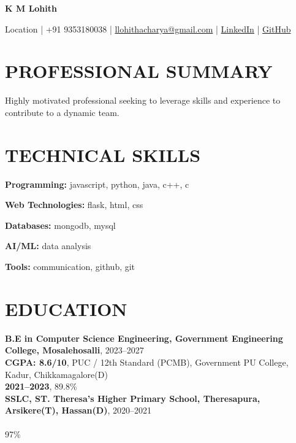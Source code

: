 \documentclass[10pt,a4paper]{article}
\begin{document}

\begin{center}

{\LARGE \textbf{K M Lohith}}

\vspace{2pt}

Location |
+91 9353180038 |
\href{mailto:llohithacharya@gmail.com}{llohithacharya@gmail.com} |
\href{https://linkedin.com/in/username}{LinkedIn} |
\href{https://github.com/username}{GitHub}

\end{center}


\section*{PROFESSIONAL SUMMARY}

Highly motivated professional seeking to leverage skills and experience to contribute to a dynamic team.


\section*{TECHNICAL SKILLS}

\textbf{Programming:} javascript, python, java, c++, c

\textbf{Web Technologies:} flask, html, css

\textbf{Databases:} mongodb, mysql

\textbf{AI/ML:} data analysis

\textbf{Tools:} communication, github, git


\section*{EDUCATION}

\noindent \textbf{B.E in Computer Science Engineering, Government Engineering College, Mosalehosalli}, 2023–2027 \hfill \vspace{5pt}\\
\noindent \textbf{CGPA: 8.6/10}, PUC / 12th Standard (PCMB), Government PU College, Kadur, Chikkamagalore(D) \hfill \vspace{5pt}\\
\noindent \textbf{2021–2023}, 89.8\% \hfill \vspace{5pt}\\
\noindent \textbf{SSLC, ST. Theresa’s Higher Primary School, Theresapura, Arsikere(T), Hassan(D)}, 2020–2021 \hfill \vspace{5pt}\\
\noindent \textbf{} \hfill \\
\null \hfill 97\%\vspace{5pt}\\
\end{document}
